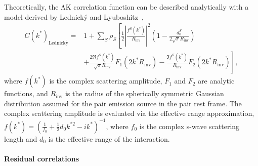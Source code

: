 \documentclass{svproc}
\newcommand{\LamK}{$\mathrm{\Lambda}\mathrm{K}$\xspace}
\begin{document}
Theoretically, the \LamK correlation function can be described analytically with a model derived by Lednick\'y and Lyuboshitz~\cite{Lednicky:82},
\begin{equation}
\begin{aligned}
C(k^{*})_{\mathrm{Lednick\acute{y}}} = &1 + \sum_{S}\rho_{S}\left[\frac{1}{2}\left|\frac{f^{S}(k^{*})}{R_{\mathrm{inv}}}\right|^2\left(1-\frac{d^{S}_{0}}{2\sqrt{\pi}R_{\mathrm{inv}}}\right) \right. \\
&+ \left. \frac{2\Re f^{S}(k^{*})}{\sqrt{\pi}R_{\mathrm{inv}}}F_{1}(2k^{*}R_{\mathrm{inv}})-\frac{\Im f^{S}(k^{*})}{R_{\mathrm{inv}}}F_{2}(2k^{*}R_{\mathrm{inv}})\right],
\end{aligned}  
\label{eqn:LednickyEqn}
\end{equation}
where $f(k^{*})$ is the complex scattering amplitude, $F_{1}$ and $F_{2}$ are analytic functions, and $R_{\mathrm{inv}}$ is the radius of the spherically symmetric Gaussian distribution assumed for the pair emission source in the pair rest frame.
The complex scattering amplitude is evaluated via the effective range approximation, $f(k^{*}) = \left( \frac{1}{f_{0}} + \frac{1}{2}d_{0}k^{*2} - ik^{*} \right)^{-1}$, where $f_{0}$ is the complex s-wave scattering length and $d_{0}$ is the effective range of the interaction.



\paragraph{Residual correlations}
\label{ResidualCorrelations}
\end{document}
